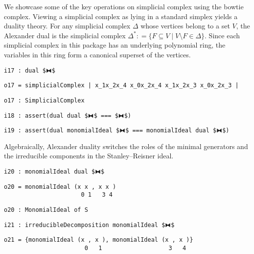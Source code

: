 \documentclass[12pt,leqno]{amsart}
\theoremstyle{definition}
\newcommand{\colequal}{\ensuremath{:\!=}}
\begin{document}
We showcase some of the key operations on simplicial complex using the bowtie
complex.  Viewing a simplicial complex as lying in a standard simplex yields a
duality theory. For any simplicial complex $\Delta$ whose vertices belong to a
set $V$, the Alexander dual is the simplicial complex
$\Delta^* \colequal \{ F \subseteq V \mathrel{|} V \setminus F \in \Delta \}$.
Since each simplicial complex in this package has an underlying polynomial
ring, the variables in this ring form a canonical superset of the vertices.
\begin{lstlisting}[xleftmargin=10pt, aboveskip=3.0pt, belowskip=1.5pt]
i17 : dual $⧓$
\end{lstlisting}
\begin{lstlisting}[xleftmargin=10pt, aboveskip=1.5pt, belowskip=1.5pt]
o17 = simplicialComplex | x_1x_2x_4 x_0x_2x_4 x_1x_2x_3 x_0x_2x_3 |
\end{lstlisting}
\begin{lstlisting}[xleftmargin=10pt, aboveskip=1.5pt, belowskip=1.5pt]
o17 : SimplicialComplex
\end{lstlisting}
\begin{lstlisting}[xleftmargin=10pt, aboveskip=1.5pt, belowskip=1.5pt]
i18 : assert(dual dual $⧓$ === $⧓$)
\end{lstlisting}
\begin{lstlisting}[xleftmargin=10pt, aboveskip=1.5pt, belowskip=3pt]
i19 : assert(dual monomialIdeal $⧓$ === monomialIdeal dual $⧓$)
\end{lstlisting}
Algebraically, Alexander duality switches the roles of the minimal generators
and the irreducible components in the Stanley--Reisner ideal.
\begin{lstlisting}[xleftmargin=10pt, aboveskip=3pt, belowskip=1.5pt]
i20 : monomialIdeal dual $⧓$
\end{lstlisting}
\begin{lstlisting}[xleftmargin=10pt, lineskip=-10pt, aboveskip=4pt, belowskip=1pt]
o20 = monomialIdeal (x x , x x )
                      0 1   3 4
\end{lstlisting}
\begin{lstlisting}[xleftmargin=10pt, aboveskip=1.5pt, belowskip=1.5pt]
o20 : MonomialIdeal of S
\end{lstlisting}
\begin{lstlisting}[xleftmargin=10pt, aboveskip=1.5pt, belowskip=1.5pt]
i21 : irreducibleDecomposition monomialIdeal $⧓$
\end{lstlisting}
\begin{lstlisting}[xleftmargin=10pt, lineskip=-10pt, aboveskip=4pt, belowskip=1pt]
o21 = {monomialIdeal (x , x ), monomialIdeal (x , x )}
                       0   1                   3   4
\end{lstlisting}
\end{document}
